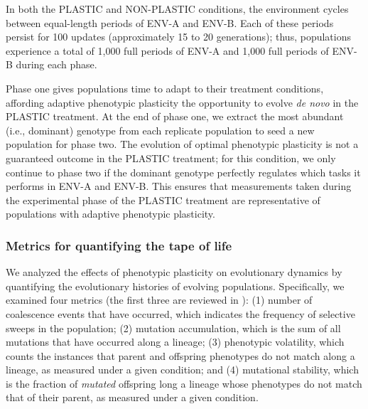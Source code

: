 In both the PLASTIC and NON-PLASTIC conditions, the environment cycles between equal-length periods of ENV-A and ENV-B.
Each of these periods persist for 100 updates (approximately 15 to 20 generations); thus, populations experience a total of 1,000 full periods of ENV-A and 1,000 full periods of ENV-B during each phase.

Phase one gives populations time to adapt to their treatment conditions, affording adaptive phenotypic plasticity the opportunity to evolve \textit{de novo} in the PLASTIC treatment.
At the end of phase one, we extract the most abundant (i.e., dominant) genotype from each replicate population to seed a new population for phase two.
The evolution of optimal phenotypic plasticity is not a guaranteed outcome in the PLASTIC treatment; for this condition, we only continue to phase two if the dominant genotype perfectly regulates which tasks it performs in ENV-A and ENV-B.
This ensures that measurements taken during the experimental phase of the PLASTIC treatment are representative of populations with adaptive phenotypic plasticity.

\vspace{1cm}
\subsubsection{Metrics for quantifying the tape of life}
\label{sec:methods:measurements}

We analyzed the effects of phenotypic plasticity on evolutionary dynamics by quantifying the evolutionary histories of evolving populations.
Specifically, we examined four metrics (the first three are reviewed in \citep{dolson_interpreting_2020}):
(1) number of coalescence events that have occurred, which indicates the frequency of selective sweeps in the population;
(2) mutation accumulation, which is the sum of all mutations that have occurred along a lineage;
(3) phenotypic volatility, which counts the instances that parent and offspring phenotypes do not match along a lineage, as measured under a given condition;
and (4) mutational stability, which is the fraction of \textit{mutated} offspring long a lineage whose phenotypes do not match that of their parent, as measured under a given condition.

